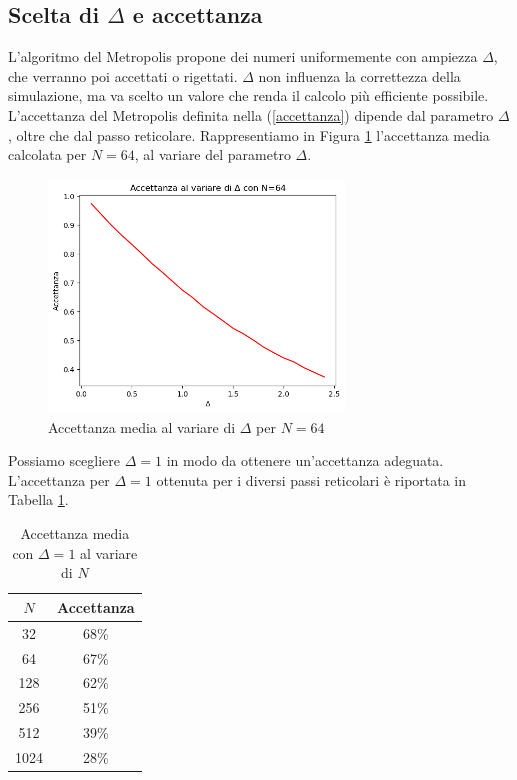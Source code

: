 \documentclass{article}
\begin{document}
\subsection{Scelta di $\Delta$ e accettanza}
L'algoritmo del Metropolis propone dei numeri uniformemente con ampiezza $\Delta$, che verranno poi accettati o rigettati. $\Delta$ non influenza la correttezza della simulazione, ma va scelto un valore che renda il calcolo più efficiente possibile. L'accettanza del Metropolis definita nella (\ref{accettanza}) dipende dal parametro $\Delta$, oltre che dal passo reticolare. Rappresentiamo in Figura \ref{grafico accettanza} l'accettanza media calcolata per $N=64$, al variare del parametro $\Delta$.
\begin{figure}[h]
    \centering
    \includegraphics[width=0.7\textwidth]{images/accettanza_N64.png}
    \caption{Accettanza media al variare di $\Delta$ per $N=64$}
    \label{grafico accettanza}
\end{figure}

Possiamo scegliere $\Delta=1$ in modo da ottenere un'accettanza adeguata. 
L'accettanza per $\Delta=1$ ottenuta per i diversi passi reticolari è riportata in Tabella \ref{tabella accettanza}. 
\begin{table}[h]
    \centering
    \begin{tabular}{||c c||} 
     \hline
     $N$ & Accettanza  \\ [0.5ex] 
     \hline\hline
     32 & 68\% \\ 
     64 & 67\%  \\
     128 & 62\%  \\
     256 & 51\%  \\ 
     512 & 39\%  \\
     1024 & 28\%  \\[1ex] 
     \hline
    \end{tabular}
    \caption{Accettanza media con $\Delta=1$ al variare di $N$}
    \label{tabella accettanza}
\end{table}
\end{document}
